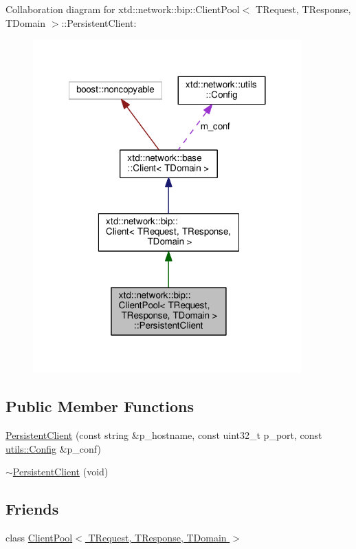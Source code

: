 Collaboration diagram for xtd\-:\-:network\-:\-:bip\-:\-:Client\-Pool$<$ T\-Request, T\-Response, T\-Domain $>$\-:\-:Persistent\-Client\-:
\nopagebreak
\begin{figure}[H]
\begin{center}
\leavevmode
\includegraphics[width=293pt]{classxtd_1_1network_1_1bip_1_1ClientPool_1_1PersistentClient__coll__graph}
\end{center}
\end{figure}
\subsection*{Public Member Functions}
\begin{DoxyCompactItemize}
\item 
\hyperlink{classxtd_1_1network_1_1bip_1_1ClientPool_1_1PersistentClient_ade4513087533d0807c995270804ffd86}{Persistent\-Client} (const string \&p\-\_\-hostname, const uint32\-\_\-t p\-\_\-port, const \hyperlink{classxtd_1_1network_1_1utils_1_1Config}{utils\-::\-Config} \&p\-\_\-conf)
\item 
\hyperlink{classxtd_1_1network_1_1bip_1_1ClientPool_1_1PersistentClient_af44e5c23cf33c46e79709200845f8abb}{$\sim$\-Persistent\-Client} (void)
\end{DoxyCompactItemize}
\subsection*{Friends}
\begin{DoxyCompactItemize}
\item 
class \hyperlink{classxtd_1_1network_1_1bip_1_1ClientPool_1_1PersistentClient_a3f5a2172b09497d719da36e7bac0eaf4}{Client\-Pool$<$ T\-Request, T\-Response, T\-Domain $>$}
\end{DoxyCompactItemize}

